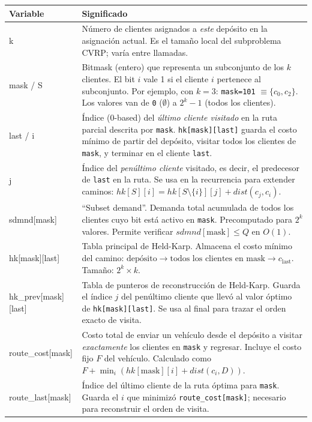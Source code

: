 \documentclass[12pt,a4paper]{article}
\begin{document}
\begin{center}
\begin{tabular}{>{\ttfamily}lp{10cm}}
\toprule
\normalfont\textbf{Variable} & \textbf{Significado} \\
\midrule
k & Número de clientes asignados a \emph{este} depósito en la asignación actual. Es el tamaño local del subproblema CVRP; varía entre llamadas. \\
\addlinespace
mask / S & Bitmask (entero) que representa un subconjunto de los $k$ clientes. El bit $i$ vale 1 si el cliente $i$ pertenece al subconjunto. Por ejemplo, con $k=3$: \texttt{mask=101} $\equiv \{c_0, c_2\}$. Los valores van de \texttt{0} ($\emptyset$) a \texttt{$2^k-1$} (todos los clientes). \\
\addlinespace
last / i & Índice (0-based) del \emph{último cliente visitado} en la ruta parcial descrita por \texttt{mask}. \texttt{hk[mask][last]} guarda el costo mínimo de partir del depósito, visitar todos los clientes de \texttt{mask}, y terminar en el cliente \texttt{last}. \\
\addlinespace
j & Índice del \emph{penúltimo cliente} visitado, es decir, el predecesor de \texttt{last} en la ruta. Se usa en la recurrencia para extender caminos: $hk[S][i] = hk[S\setminus\{i\}][j] + dist(c_j, c_i)$. \\
\addlinespace
sdmnd[mask] & ``Subset demand''. Demanda total acumulada de todos los clientes cuyo bit está activo en \texttt{mask}. Precomputado para $2^k$ valores. Permite verificar $sdmnd[\text{mask}] \leq Q$ en $O(1)$. \\
\addlinespace
hk[mask][last] & Tabla principal de Held-Karp. Almacena el costo mínimo del camino: $\text{depósito} \to \text{todos los clientes en mask} \to c_{\text{last}}$. Tamaño: $2^k \times k$. \\
\addlinespace
hk\_prev[mask][last] & Tabla de punteros de reconstrucción de Held-Karp. Guarda el índice $j$ del penúltimo cliente que llevó al valor óptimo de \texttt{hk[mask][last]}. Se usa al final para trazar el orden exacto de visita. \\
\addlinespace
route\_cost[mask] & Costo total de enviar un vehículo desde el depósito a visitar \emph{exactamente} los clientes en \texttt{mask} y regresar. Incluye el costo fijo $F$ del vehículo. Calculado como $F + \min_i(hk[\text{mask}][i] + dist(c_i, D))$. \\
\addlinespace
route\_last[mask] & Índice del último cliente de la ruta óptima para \texttt{mask}. Guarda el $i$ que minimizó \texttt{route\_cost[mask]}; necesario para reconstruir el orden de visita. \\

\end{tabular}
\end{center}
\end{document}
